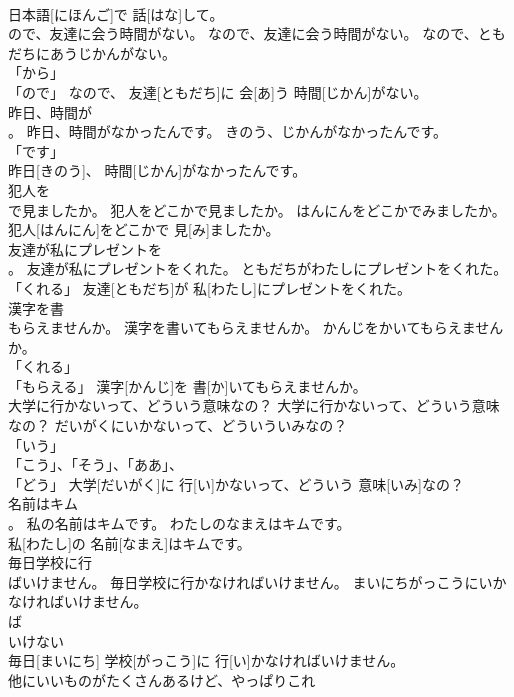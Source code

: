 \documentclass[8pt]{extreport}
\begin{document}
\begin{CJK}{UTF8}{min}
\\	日本語[にほんご]で 話[はな]して。		
\\	ので、友達に会う時間がない。	なので、友達に会う時間がない。	なので、ともだちにあうじかんがない。	
\\	「から」 
\\	「ので」	なので、 友達[ともだち]に 会[あ]う 時間[じかん]がない。		
\\	昨日、時間が
\\	。	昨日、時間がなかったんです。	きのう、じかんがなかったんです。	
\\	「です」 
\\	昨日[きのう]、 時間[じかん]がなかったんです。		
\\	犯人を
\\	で見ましたか。	犯人をどこかで見ましたか。	はんにんをどこかでみましたか。	
\\	犯人[はんにん]をどこかで 見[み]ましたか。		
\\	友達が私にプレゼントを
\\	。	友達が私にプレゼントをくれた。	ともだちがわたしにプレゼントをくれた。	
\\	「くれる」	友達[ともだち]が 私[わたし]にプレゼントをくれた。		
\\	漢字を書
\\	もらえませんか。	漢字を書いてもらえませんか。	かんじをかいてもらえませんか。	
\\	「くれる」 
\\	「もらえる」	漢字[かんじ]を 書[か]いてもらえませんか。		
\\	大学に行かないって、どういう意味なの？	大学に行かないって、どういう意味なの？	だいがくにいかないって、どういういみなの？	
\\	「いう」 
\\	「こう」、「そう」、「ああ」、
\\	「どう」	大学[だいがく]に 行[い]かないって、どういう 意味[いみ]なの？		
\\	名前はキム
\\	。	私の名前はキムです。	わたしのなまえはキムです。	
\\	私[わたし]の 名前[なまえ]はキムです。		
\\	毎日学校に行
\\	ばいけません。	毎日学校に行かなければいけません。	まいにちがっこうにいかなければいけません。	
\\	ば
\\	いけない
\\	毎日[まいにち] 学校[がっこう]に 行[い]かなければいけません。		
\\	他にいいものがたくさんあるけど、やっぱりこれ

\end{CJK}
\end{document}
